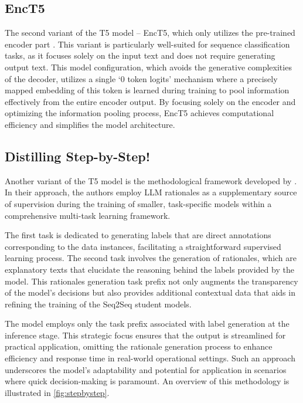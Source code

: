 \subsection{EncT5}

The second variant of the T5 model -- EncT5, which only utilizes the pre-trained encoder part \cite{enct5}. This variant is particularly well-suited for sequence classification tasks, as it focuses solely on the input text and does not require generating output text. This model configuration, which avoids the generative complexities of the decoder, utilizes a single `0 token logits' mechanism where a precisely mapped embedding of this token is learned during training to pool information effectively from the entire encoder output. By focusing solely on the encoder and optimizing the information pooling process, EncT5 achieves computational efficiency and simplifies the model architecture.

\subsection{Distilling Step-by-Step!}

Another variant of the T5 model is the methodological framework developed by \citeauthor{stepbystep} \cite{stepbystep}. In their approach, the authors employ LLM rationales as a supplementary source of supervision during the training of smaller, task-specific models within a comprehensive multi-task learning framework.

The first task is dedicated to generating labels that are direct annotations corresponding to the data instances, facilitating a straightforward supervised learning process. The second task involves the generation of rationales, which are explanatory texts that elucidate the reasoning behind the labels provided by the model. This rationales generation task prefix not only augments the transparency of the model's decisions but also provides additional contextual data that aids in refining the training of the Seq2Seq student models.

The model employs only the task prefix associated with label generation at the inference stage. This strategic focus ensures that the output is streamlined for practical application, omitting the rationale generation process to enhance efficiency and response time in real-world operational settings. Such an approach underscores the model's adaptability and potential for application in scenarios where quick decision-making is paramount. An overview of this methodology is illustrated in \autoref{fig:stepbystep}.

